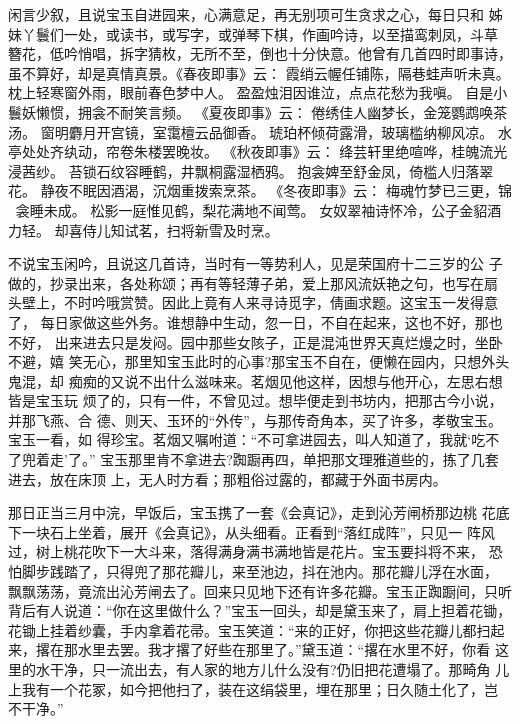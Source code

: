 闲言少叙，且说宝玉自进园来，心满意足，再无别项可生贪求之心，每日只和
姊妹丫鬟们一处，或读书，或写字，或弹琴下棋，作画吟诗，以至描鸾刺凤，斗草
簪花，低吟悄唱，拆字猜枚，无所不至，倒也十分快意。他曾有几首四时即事诗，
虽不算好，却是真情真景。《春夜即事》云：
霞绡云幄任铺陈，隔巷蛙声听未真。
枕上轻寒窗外雨，眼前春色梦中人。
盈盈烛泪因谁泣，点点花愁为我嗔。
自是小鬟妖懒惯，拥衾不耐笑言频。
《夏夜即事》云：
倦绣佳人幽梦长，金笼鹦鹉唤茶汤。
窗明麝月开宫镜，室霭檀云品御香。
琥珀杯倾荷露滑，玻璃槛纳柳风凉。
水亭处处齐纨动，帘卷朱楼罢晚妆。
《秋夜即事》云：
绛芸轩里绝喧哗，桂魄流光浸茜纱。
苔锁石纹容睡鹤，井飘桐露湿栖鸦。
抱衾婢至舒金凤，倚槛人归落翠花。
静夜不眠因酒渴，沉烟重拨索烹茶。
《冬夜即事》云：
梅魂竹梦已三更，锦衾睡未成。
松影一庭惟见鹤，梨花满地不闻莺。
女奴翠袖诗怀冷，公子金貂酒力轻。
却喜侍儿知试茗，扫将新雪及时烹。

不说宝玉闲吟，且说这几首诗，当时有一等势利人，见是荣国府十二三岁的公
子做的，抄录出来，各处称颂；再有等轻薄子弟，爱上那风流妖艳之句，也写在扇
头壁上，不时吟哦赏赞。因此上竟有人来寻诗觅字，倩画求题。这宝玉一发得意了，
每日家做这些外务。谁想静中生动，忽一日，不自在起来，这也不好，那也不好，
出来进去只是发闷。园中那些女陔子，正是混沌世界天真烂熳之时，坐卧不避，嬉
笑无心，那里知宝玉此时的心事?那宝玉不自在，便懒在园内，只想外头鬼混，却
痴痴的又说不出什么滋味来。茗烟见他这样，因想与他开心，左思右想皆是宝玉玩
烦了的，只有一件，不曾见过。想毕便走到书坊内，把那古今小说，并那飞燕、合
德、则天、玉环的“外传”，与那传奇角本，买了许多，孝敬宝玉。宝玉一看，如
得珍宝。茗烟又嘱咐道：“不可拿进园去，叫人知道了，我就‘吃不了兜着走’了。”
宝玉那里肯不拿进去?踟蹰再四，单把那文理雅道些的，拣了几套进去，放在床顶
上，无人时方看；那粗俗过露的，都藏于外面书房内。

那日正当三月中浣，早饭后，宝玉携了一套《会真记》，走到沁芳闸桥那边桃
花底下一块石上坐着，展开《会真记》，从头细看。正看到“落红成阵”，只见一
阵风过，树上桃花吹下一大斗来，落得满身满书满地皆是花片。宝玉要抖将不来，
恐怕脚步践踏了，只得兜了那花瓣儿，来至池边，抖在池内。那花瓣儿浮在水面，
飘飘荡荡，竟流出沁芳闸去了。回来只见地下还有许多花瓣。宝玉正踟蹰间，只听
背后有人说道：“你在这里做什么？”宝玉一回头，却是黛玉来了，肩上担着花锄，
花锄上挂着纱囊，手内拿着花帚。宝玉笑道：“来的正好，你把这些花瓣儿都扫起
来，撂在那水里去罢。我才撂了好些在那里了。”黛玉道：“撂在水里不好，你看
这里的水干净，只一流出去，有人家的地方儿什么没有?仍旧把花遭塌了。那畸角
儿上我有一个花冢，如今把他扫了，装在这绢袋里，埋在那里；日久随土化了，岂
不干净。”


